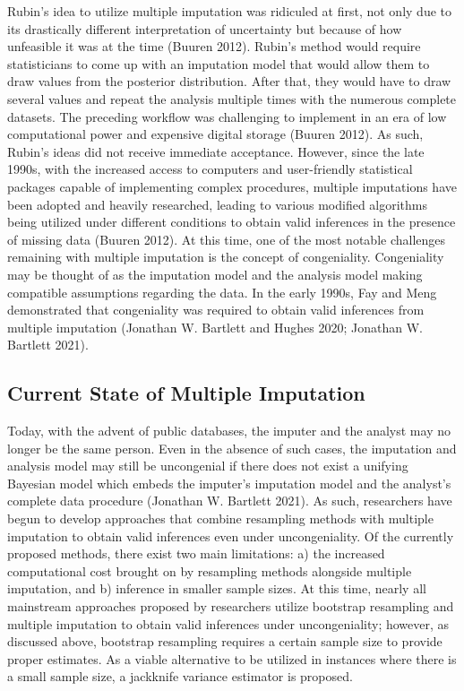 \documentclass[
  letterpaper,
  DIV=11,
  numbers=noendperiod]{scrreprt}
\begin{document}
Rubin's idea to utilize multiple imputation was ridiculed at first, not
only due to its drastically different interpretation of uncertainty but
because of how unfeasible it was at the time (Buuren 2012). Rubin's
method would require statisticians to come up with an imputation model
that would allow them to draw values from the posterior distribution.
After that, they would have to draw several values and repeat the
analysis multiple times with the numerous complete datasets. The
preceding workflow was challenging to implement in an era of low
computational power and expensive digital storage (Buuren 2012). As
such, Rubin's ideas did not receive immediate acceptance. However, since
the late 1990s, with the increased access to computers and user-friendly
statistical packages capable of implementing complex procedures,
multiple imputations have been adopted and heavily researched, leading
to various modified algorithms being utilized under different conditions
to obtain valid inferences in the presence of missing data (Buuren
2012). At this time, one of the most notable challenges remaining with
multiple imputation is the concept of congeniality. Congeniality may be
thought of as the imputation model and the analysis model making
compatible assumptions regarding the data. In the early 1990s, Fay and
Meng demonstrated that congeniality was required to obtain valid
inferences from multiple imputation (Jonathan W. Bartlett and Hughes
2020; Jonathan W. Bartlett 2021).

\hypertarget{current-state-of-multiple-imputation}{%
\subsection{Current State of Multiple
Imputation}\label{current-state-of-multiple-imputation}}

Today, with the advent of public databases, the imputer and the analyst
may no longer be the same person. Even in the absence of such cases, the
imputation and analysis model may still be uncongenial if there does not
exist a unifying Bayesian model which embeds the imputer's imputation
model and the analyst's complete data procedure (Jonathan W. Bartlett
2021). As such, researchers have begun to develop approaches that
combine resampling methods with multiple imputation to obtain valid
inferences even under uncongeniality. Of the currently proposed methods,
there exist two main limitations: a) the increased computational cost
brought on by resampling methods alongside multiple imputation, and b)
inference in smaller sample sizes. At this time, nearly all mainstream
approaches proposed by researchers utilize bootstrap resampling and
multiple imputation to obtain valid inferences under uncongeniality;
however, as discussed above, bootstrap resampling requires a certain
sample size to provide proper estimates. As a viable alternative to be
utilized in instances where there is a small sample size, a jackknife
variance estimator is proposed.
\end{document}

